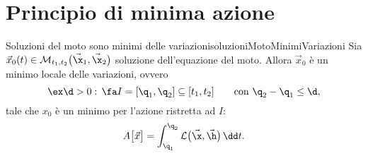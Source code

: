 \section{Principio di minima azione}

\begin{teor}{Soluzioni del moto sono minimi delle variazioni}{soluzioniMotoMinimiVariazioni}
	Sia \(\vec{x}_0(t) \in \mathcal{M}_{t_1,t_2}\big(\vec{\x}_1,\vec{\x}_2\big)\) soluzione dell'equazione del moto. Allora \(\vec{x}_0\) è un minimo locale delle variazioni, ovvero
	\[
		\ex \d > 0 : \,\fa I = [\q_1,\q_2] \subseteq [t_1,t_2] \qquad\text{con }\q_2-\q_1 \le \d,
	\]
	tale che \(x_0\) è un minimo per l'azione ristretta ad \(I\):
	\[
		A\big[\vec{x}\big] = \int_{\q_1}^{\q_2} \mathcal{L}\big(\vec{\x},\vec{\h}\big)\,\dd t.
	\]
\end{teor}

